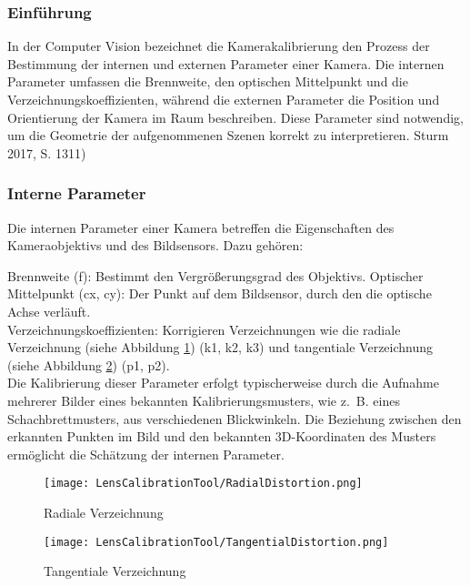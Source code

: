 {    \subsubsection{Einführung}
    {In der Computer Vision bezeichnet die Kamerakalibrierung den Prozess der Bestimmung der internen und externen Parameter einer Kamera. Die internen Parameter umfassen die Brennweite, den optischen Mittelpunkt und die Verzeichnungskoeffizienten, während die externen Parameter die Position und Orientierung der Kamera im Raum beschreiben. Diese Parameter sind notwendig, um die Geometrie der aufgenommenen Szenen korrekt zu interpretieren. \cite{Ramalingam:2017} Sturm 2017, S. 1311)
    }
    
    \subsubsection{Interne Parameter}
    {Die internen Parameter einer Kamera betreffen die Eigenschaften des Kameraobjektivs und des Bildsensors. Dazu gehören:
        
        Brennweite (f): Bestimmt den Vergrößerungsgrad des Objektivs.
        Optischer Mittelpunkt (cx, cy): Der Punkt auf dem Bildsensor, durch den die optische Achse verläuft.\\
        Verzeichnungskoeffizienten: Korrigieren Verzeichnungen wie die radiale Verzeichnung (siehe Abbildung \ref{fig:Radiale Verzeichnung}) (k1, k2, k3) und tangentiale Verzeichnung (siehe Abbildung \ref{fig:Tangentiale Verzeichnung}) (p1, p2).\\
        Die Kalibrierung dieser Parameter erfolgt typischerweise durch die Aufnahme mehrerer Bilder eines bekannten Kalibrierungsmusters, wie z. B. eines Schachbrettmusters, aus verschiedenen Blickwinkeln. Die Beziehung zwischen den erkannten Punkten im Bild und den bekannten 3D-Koordinaten des Musters ermöglicht die Schätzung der internen Parameter. \cite{Grossberg:2001}
    }
    
    \begin{figure}
        \centering
        \texttt{[image: LensCalibrationTool/RadialDistortion.png]}
        \caption{Radiale Verzeichnung} %
        \label{fig:Radiale Verzeichnung}
    \end{figure}
    
    \begin{figure}
        \centering
        \texttt{[image: LensCalibrationTool/TangentialDistortion.png]}
        \caption{Tangentiale Verzeichnung} %
        \label{fig:Tangentiale Verzeichnung}
    \end{figure}
    
}
